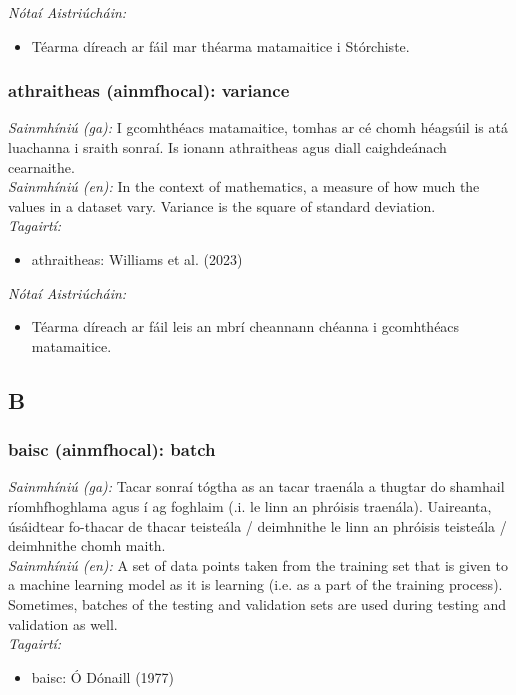 \documentclass{article}
\begin{document}
 \noindent \textit{Nótaí Aistriúcháin:}
\begin{itemize}
	\item Téarma díreach ar fáil mar théarma matamaitice i Stórchiste.
\end{itemize}


\subsubsection*{athraitheas (ainmfhocal): variance}
 \noindent \textit{Sainmhíniú (ga):} I gcomhthéacs matamaitice, tomhas ar cé chomh héagsúil is atá luachanna i sraith sonraí. Is ionann athraitheas agus diall caighdeánach cearnaithe.
\\
 \noindent \textit{Sainmhíniú (en):} In the context of mathematics, a measure of how much the values in a dataset vary. Variance is the square of standard deviation.
\\
 \noindent \textit{Tagairtí:}
\begin{itemize}
	\item athraitheas: Williams et al. (2023) \cite{storchiste}
\end{itemize}

 \noindent \textit{Nótaí Aistriúcháin:}
\begin{itemize}
	\item Téarma díreach ar fáil leis an mbrí cheannann chéanna i gcomhthéacs matamaitice.
\end{itemize}


\subsection*{B}

\subsubsection*{baisc (ainmfhocal): batch}
 \noindent \textit{Sainmhíniú (ga):} Tacar sonraí tógtha as an tacar traenála a thugtar do shamhail ríomhfhoghlama agus í ag foghlaim (.i. le linn an phróisis traenála). Uaireanta, úsáidtear fo-thacar de thacar teisteála / deimhnithe le linn an phróisis teisteála / deimhnithe chomh maith.
\\
 \noindent \textit{Sainmhíniú (en):} A set of data points taken from the training set that is given to a machine learning model as it is learning (i.e. as a part of the training process). Sometimes, batches of the testing and validation sets are used during testing and validation as well.
\\
 \noindent \textit{Tagairtí:}
\begin{itemize}
	\item baisc: Ó Dónaill (1977) \cite{odonaill}
\end{itemize}
\end{document}

